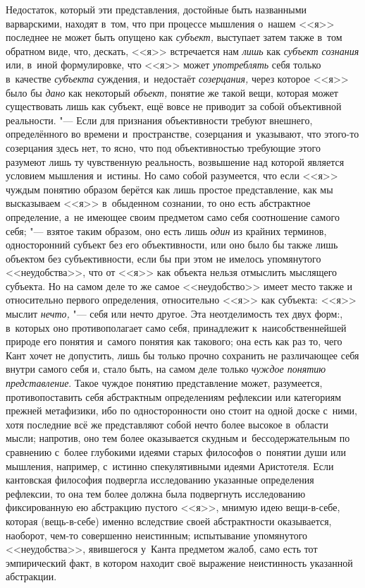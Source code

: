 Недостаток, который эти представления, достойные быть
названными варварскими, находят в~том, что при процессе мышления о~нашем
<<я>> последнее не может быть опущено как
{\em субъект,} выступает
затем также в~том обратном виде, что, дескать, <<я>> встречается нам
{\em лишь} как
{\em субъект сознания}
или, в~иной формулировке, что <<я>> может
{\em употреблять} себя
только в~качестве {\em субъекта}
суждения, и~недостаёт
{\em созерцания,} через
которое <<я>> было бы {\em дано}
как некоторый
{\em объект,} понятие же
такой вещи, которая может существовать лишь как субъект, ещё вовсе не
приводит за собой объективной
реальности\label{bkm:bm98}.
"--- Если для признания объективности требуют внешнего,
определённого во времени и~пространстве, созерцания и~указывают, что
этого-то созерцания здесь нет, то ясно, что под объективностью требующие
этого разумеют лишь ту чувственную реальность, возвышение над которой
является условием мышления и~истины. Но само собой разумеется, что если <<я>>
чуждым понятию образом берётся как лишь простое представление, как мы
высказываем <<я>> в~обыденном сознании, то оно есть абстрактное определение,
а~не имеющее своим предметом само себя соотношение самого
себя; "--- взятое таким образом, оно есть лишь
{\em один} из крайних
терминов, односторонний субъект без его объективности, или оно было бы
также лишь объектом без субъективности, если бы при этом не имелось
упомянутого <<неудобства>>, что от <<я>> как объекта нельзя отмыслить мыслящего
субъекта. Но на самом деле то же самое <<неудобство>> имеет место также и
относительно первого определения, относительно <<я>> как субъекта: <<я>> мыслит
{\em нечто,} "--- себя или
нечто другое. Эта неотделимость тех двух форм:, в~которых оно
противополагает само себя, принадлежит к~наисобственнейшей природе его
понятия и~самого понятия как такового; она есть как раз то, чего Кант хочет
не допустить, лишь бы только прочно сохранить не различающее
себя внутри самого себя и, стало быть, на самом деле только
{\em чуждое понятию представление}.
Такое чуждое понятию представление может, разумеется,
противопоставить себя абстрактным определениям рефлексии или категориям
прежней метафизики, ибо по односторонности оно стоит на одной доске с~ними,
хотя последние всё же представляют собой нечто более высокое в~области
мысли; напротив, оно тем более оказывается скудным и~бессодержательным по
сравнению с~более глубокими идеями старых философов о~понятии души или
мышления, например, с~истинно спекулятивными идеями Аристотеля. Если
кантовская философия подвергла исследованию указанные определения
рефлексии, то она тем более должна была подвергнуть исследованию
фиксированную ею абстракцию пустого <<я>>, мнимую идею вещи-в-себе, которая
(вещь-в-себе) именно вследствие своей абстрактности оказывается, наоборот,
чем-то совершенно неистинным; испытывание упомянутого <<неудобства>>,
явившегося у~Канта предметом жалоб, само есть тот эмпирический факт, в
котором находит своё выражение неистинность указанной абстракции.

